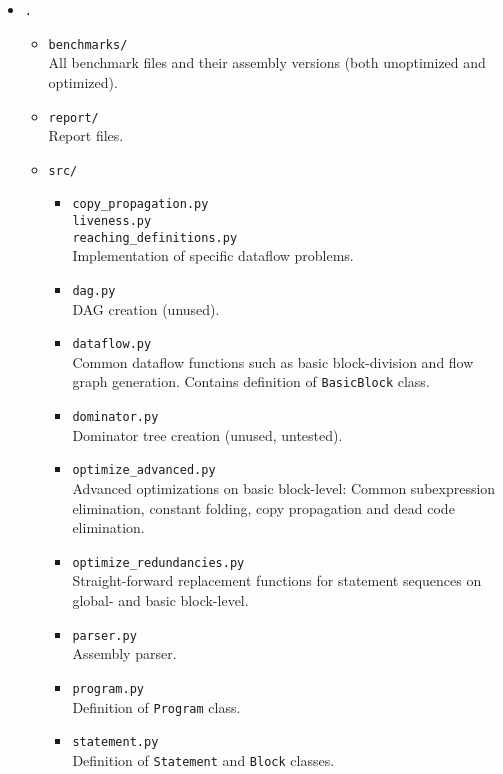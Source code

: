 \documentclass[10pt,a4paper]{article}
\begin{document}
\begin{itemize}
\item \texttt{.}
    \begin{itemize}
    \item \texttt{benchmarks/} \\
        All benchmark files and their assembly versions (both unoptimized and
        optimized).
    \item \texttt{report/} \\
        Report files.
    \item \texttt{src/}
        \begin{itemize}
        \item \texttt{copy\_propagation.py} \\
              \texttt{liveness.py} \\
              \texttt{reaching\_definitions.py} \\
              Implementation of specific dataflow problems.
        \item \texttt{dag.py} \\
            DAG creation (unused).
        \item \texttt{dataflow.py} \\
            Common dataflow functions such as basic block-division and flow
            graph generation. Contains definition of \texttt{BasicBlock} class.
        \item \texttt{dominator.py} \\
            Dominator tree creation (unused, untested).
        \item \texttt{optimize\_advanced.py} \\
            Advanced optimizations on basic block-level: Common subexpression
            elimination, constant folding, copy propagation and dead code
            elimination.
        \item \texttt{optimize\_redundancies.py} \\
            Straight-forward replacement functions for statement sequences on
            global- and basic block-level.
        \item \texttt{parser.py} \\
            Assembly parser.
        \item \texttt{program.py} \\
            Definition of \texttt{Program} class.
        \item \texttt{statement.py} \\
            Definition of \texttt{Statement} and \texttt{Block} classes.

\end{itemize}
\end{itemize}
\end{itemize}
\end{document}
